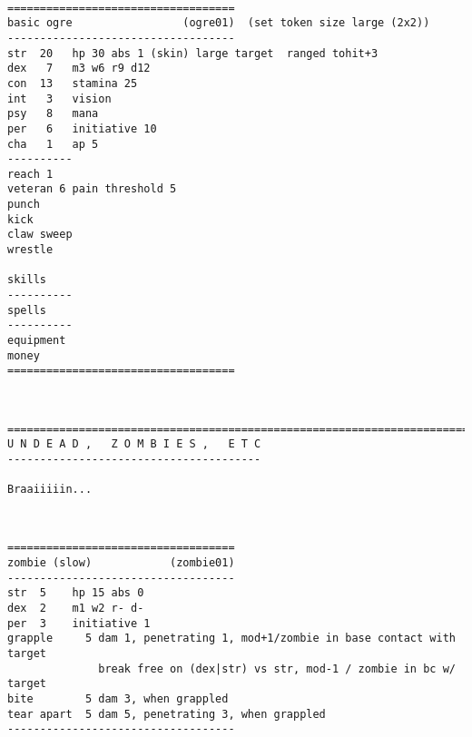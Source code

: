 \

\goodbreak \begin{samepage} \small \begin{verbatim}
===================================
basic ogre                 (ogre01)  (set token size large (2x2))
-----------------------------------
str  20   hp 30 abs 1 (skin) large target  ranged tohit+3
dex   7   m3 w6 r9 d12
con  13   stamina 25
int   3   vision
psy   8   mana
per   6   initiative 10
cha   1   ap 5
----------
reach 1
veteran 6 pain threshold 5
punch
kick
claw sweep
wrestle

skills
----------
spells
----------
equipment
money
===================================
\end{verbatim} \normalsize \end{samepage}

\








\goodbreak
{}

\goodbreak \begin{samepage} \small \begin{verbatim}
================================================================================
U N D E A D ,   Z O M B I E S ,   E T C
---------------------------------------

Braaiiiiin...
\end{verbatim} \normalsize \end{samepage}

\

\goodbreak \begin{samepage} \small \begin{verbatim}
===================================
zombie (slow)            (zombie01)
-----------------------------------
str  5    hp 15 abs 0
dex  2    m1 w2 r- d-
per  3    initiative 1
grapple     5 dam 1, penetrating 1, mod+1/zombie in base contact with target
              break free on (dex|str) vs str, mod-1 / zombie in bc w/ target
bite        5 dam 3, when grappled
tear apart  5 dam 5, penetrating 3, when grappled
-----------------------------------
\end{verbatim} \normalsize \end{samepage}

